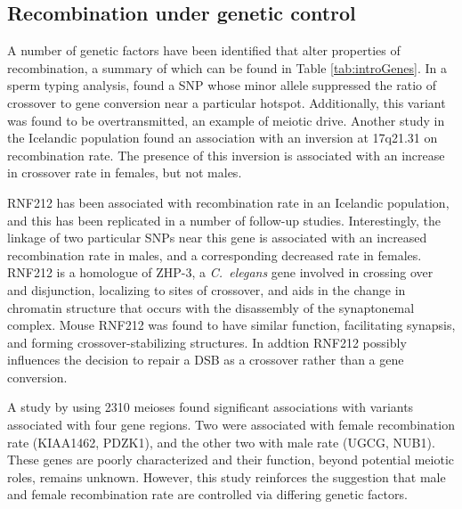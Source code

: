 \subsection{Recombination under genetic control}

A number of genetic factors have been identified that alter properties of recombination, a summary of which can be found in Table \ref{tab:introGenes}.
In a sperm typing analysis, \citet{Jeffreys2005} found a SNP whose minor allele suppressed the ratio of crossover to gene conversion near a particular hotspot.
Additionally, this variant was found to be overtransmitted, an example of meiotic drive.
Another study in the Icelandic population found an association with an inversion at 17q21.31 on recombination rate\cite{Stefansson2005}.
The presence of this inversion is associated with an increase in crossover rate in females, but not males.

RNF212 has been associated with recombination rate in an Icelandic population\cite{Kong2008}, and this has been replicated in a number of follow-up studies\cite{Chowdhury2009,Fledel-Alon2011,Reynolds2013,Kong2014}.
Interestingly, the linkage of two particular SNPs near this gene is associated with an increased recombination rate in males, and a corresponding decreased rate in females.
RNF212 is a homologue of ZHP-3, a \textit{C.\ elegans} gene involved in crossing over and disjunction, localizing to sites of crossover, and aids in the change in chromatin structure that occurs with the disassembly of the synaptonemal complex\cite{Bhalla2008}.
Mouse RNF212 was found to have similar function, facilitating synapsis, and forming crossover-stabilizing structures\cite{Reynolds2013}.
In addtion RNF212 possibly influences the decision to repair a DSB as a crossover rather than a gene conversion\cite{Reynolds2013}.

A study by \citet{Chowdhury2009} using 2310 meioses found significant associations with variants associated with four gene regions.
Two were associated with female recombination rate (KIAA1462, PDZK1), and the other two with male rate (UGCG, NUB1).
These genes are poorly characterized and their function, beyond potential meiotic roles, remains unknown.
However, this study reinforces the suggestion that male and female recombination rate are controlled via differing genetic factors.

